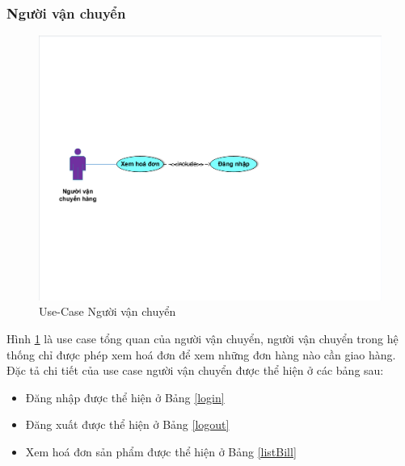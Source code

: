 \subsubsection{Người vận chuyển}
\begin{center}
    \begin{figure}[h]
    \begin{center}
     \includegraphics[scale=0.7]{image/UseCaseTongQuanNVC.pdf}
    \end{center}
    \caption{Use-Case Người vận chuyển}
    \label{refhinh3_5}
    \end{figure}
\end{center}
Hình \ref{refhinh3_5} là use case tổng quan của người vận chuyển, người vận chuyển trong hệ thống chỉ được phép xem hoá đơn để xem những đơn hàng nào cần giao hàng. Đặc tả chi tiết của use case người vận chuyển được thể hiện ở các bảng sau:
\begin{itemize}
\item Đăng nhập được thể hiện ở Bảng \ref{login}
\item Đăng xuất được thể hiện ở Bảng \ref{logout}
\item Xem hoá đơn sản phẩm được thể hiện ở Bảng \ref{listBill}
\end{itemize}
